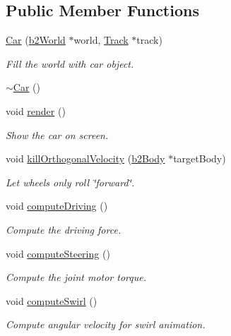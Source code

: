 \subsection*{Public Member Functions}
\begin{DoxyCompactItemize}
\item 
\mbox{\hyperlink{class_car_a7476a5a35b839770aebb08c8fac7505c}{Car}} (\mbox{\hyperlink{classb2_world}{b2\+World}} $\ast$world, \mbox{\hyperlink{class_track}{Track}} $\ast$track)
\begin{DoxyCompactList}\small\item\em Fill the world with car object. \end{DoxyCompactList}\item 
\mbox{\hyperlink{class_car_a5933bb06e96b159fe339a128abda888a}{$\sim$\+Car}} ()
\item 
void \mbox{\hyperlink{class_car_a500e212637d70b136930a96ef5ff9062}{render}} ()
\begin{DoxyCompactList}\small\item\em Show the car on screen. \end{DoxyCompactList}\item 
void \mbox{\hyperlink{class_car_a3655a9289056301defdf00d2314f8bf9}{kill\+Orthogonal\+Velocity}} (\mbox{\hyperlink{classb2_body}{b2\+Body}} $\ast$target\+Body)
\begin{DoxyCompactList}\small\item\em Let wheels only roll \char`\"{}forward\char`\"{}. \end{DoxyCompactList}\item 
void \mbox{\hyperlink{class_car_aaa9dcb32944a41ce2a78d514416fc0ac}{compute\+Driving}} ()
\begin{DoxyCompactList}\small\item\em Compute the driving force. \end{DoxyCompactList}\item 
void \mbox{\hyperlink{class_car_a068bac1244634e89b1ce7d503b99e276}{compute\+Steering}} ()
\begin{DoxyCompactList}\small\item\em Compute the joint motor torque. \end{DoxyCompactList}\item 
void \mbox{\hyperlink{class_car_aa469a8a2a7fcae7dfce21c436050769b}{compute\+Swirl}} ()
\begin{DoxyCompactList}\small\item\em Compute angular velocity for swirl animation. \end{DoxyCompactList}\item 

\end{DoxyCompactItemize}
